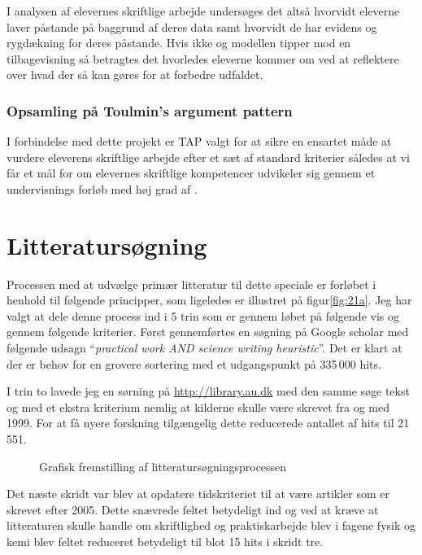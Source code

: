 I analysen af elevernes skriftlige arbejde undersøges det altså hvorvidt eleverne laver påstande på baggrund af deres data samt hvorvidt de har evidens og rygdækning for deres påstande. Hvis ikke og modellen tipper mod en tilbagevisning så betragtes det hvorledes eleverne kommer om ved at reflektere over hvad der så kan gøres for at forbedre udfaldet.

\subsubsection{Opsamling på Toulmin's argument pattern}
I forbindelse med dette projekt er TAP valgt for at sikre en ensartet måde at vurdere eleverens skriftlige arbejde efter et sæt af standard kriterier således at vi får et mål for om elevernes skriftlige kompetencer udvikeler sig gennem et undervisnings forløb med høj grad af \ib{}. 

\section{Litteratursøgning}
\label{sec:lit}

Processen med at udvælge primær litteratur til dette speciale er forløbet i henhold til følgende principper, som ligeledes er illustret på  figur\vref{fig:21a}. Jeg har valgt at dele denne process ind i 5 trin som er gennem løbet på følgende vis og gennem følgende kriterier. Først gennemførtes en søgning på Google scholar med følgende udsagn ``\emph{practical work AND science writing heuristic}''. Det er klart at der er behov for en grovere sortering med et udgangspunkt på 335\,000 hits. 

I trin to lavede jeg en sørning på \url{http://library.au.dk} med den samme søge tekst og med et ekstra kriterium nemlig at kilderne skulle være skrevet fra og med 1999. For at få nyere forskning tilgængelig dette reducerede antallet af hits til 21\,551. 
\begin{figure}
	\centering
	\vspace{-20pt}
	\vspace{0pt}
	\caption[Litteratursøgningsprocessen]{Grafisk fremstilling af litteratursøgningsprocessen}
	\label{fig:21a}
	\vspace{-20pt}
\end{figure}
Det næste skridt var blev at opdatere tidskriteriet til at være artikler som er skrevet efter 2005. Dette snævrede feltet betydeligt ind og ved at kræve at litteraturen skulle handle om skriftlighed og praktiskarbejde blev i fagene fysik og kemi blev feltet reduceret betydeligt til blot 15 hits i skridt tre.

